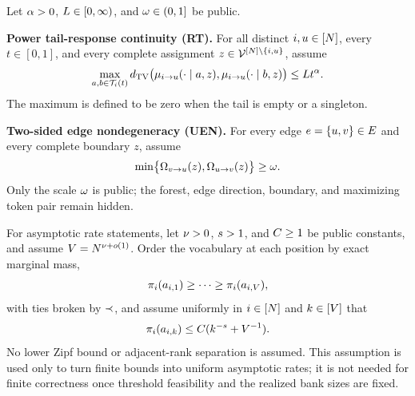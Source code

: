 \begin{assumption}
\label{app:ass:response-regularity}
Let $\alpha>0$, $L\in[0,\infty)$, and
$\omega\in(0,1]$ be public.

\textbf{Power tail-response continuity (RT).}
For all distinct $i,u\in[N]$, every $t\in[0,1]$, and every complete assignment
$z\in\mathcal V^{[N]\setminus\{i,u\}}$, assume
\begin{equation}
 \max_{a,b\in\mathcal T_{i}(t)}
 d_{\mathrm{TV}}\bigl(
 \mu_{i\to u}(\cdot\mid a,z),
 \mu_{i\to u}(\cdot\mid b,z)
 \bigr)
 \le L t^{\alpha}.
 \label{app:eq:RT}
\end{equation}
The maximum is defined to be zero when the tail is empty or a singleton.

\textbf{Two-sided edge nondegeneracy (UEN).}
For every edge
$e=\{u,v\}\in E$ and every complete boundary $z$, assume
\begin{equation}
 \min\bigl\{
  \Omega_{v\to u}(z),
  \Omega_{u\to v}(z)
 \bigr\}
 \ge \omega.
 \label{app:eq:UEN}
\end{equation}
Only the scale $\omega$ is public; the forest, edge direction,
boundary, and maximizing token pair remain hidden.
\end{assumption}

\begin{assumption}
\label{app:ass:rate-regime}
For asymptotic rate statements, let $\nu>0$,
$s>1$, and $C\ge1$ be public constants, and
assume $V=N^{\nu+o(1)}$.  Order the vocabulary at each position by exact
marginal mass,
\begin{equation}
 \pi_{i}(a_{i,1})\ge\cdots\ge
 \pi_{i}(a_{i,V}),
 \label{app:eq:hidden-ranks}
\end{equation}
with ties broken by $\prec$, and assume uniformly in $i\in[N]$ and
$k\in[V]$ that
\begin{equation}
 \pi_{i}(a_{i,k})
 \le C
      (k^{-s}+V^{-1}).
 \label{app:eq:RF}
\end{equation}
No lower Zipf bound or adjacent-rank separation is assumed.  This assumption
is used only to turn finite bounds into uniform asymptotic rates; it is not
needed for finite correctness once threshold feasibility and the realized bank
sizes are fixed.
\end{assumption}

